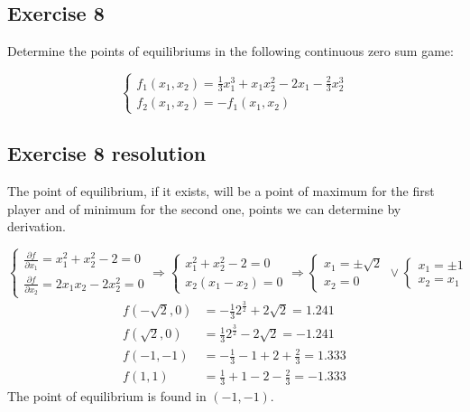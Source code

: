 \documentclass[\main/main.tex]{subfiles}
\begin{document}
\subsection{Exercise 8}
Determine the points of equilibriums in the following continuous zero sum game:

\[
  \begin{cases}
    f_1(x_1,x_2) = \frac{1}{3}x_1^3 + x_1x_2^2 - 2x_1 - \frac{2}{3}x_2^3 \\
    f_2(x_1,x_2) = -f_1(x_1,x_2)
  \end{cases}
\]
\subsection{Exercise 8 resolution}
The point of equilibrium, if it exists, will be a point of maximum for the first player and of minimum for the second one, points we can determine by derivation.

\[
  \begin{cases}
    \frac{\partial f}{\partial x_1}=x_1^2 + x_2^2 -2 = 0 \\
    \frac{\partial f}{\partial x_2}=2x_1x_2 -2x_2^2=0
  \end{cases}
  \Rightarrow
  \begin{cases}
    x_1^2 + x_2^2 -2 = 0 \\
    x_2(x_1 -x_2)=0
  \end{cases}
  \Rightarrow
  \begin{cases}
    x_1 = \pm \sqrt{2} \\
    x_2=0
  \end{cases}
  \lor
  \begin{cases}
    x_1 = \pm 1 \\
    x_2=x_1
  \end{cases}
\]
\begin{align*}
  f(-\sqrt{2},0) & = -\frac{1}{3}2^{\frac{3}{2}} + 2\sqrt{2} = 1.241 \\
  f(\sqrt{2},0)  & = \frac{1}{3}2^{\frac{3}{2}} - 2\sqrt{2} = -1.241 \\
  f(-1,-1)       & = -\frac{1}{3} -1 +2 + \frac{2}{3} = 1.333        \\
  f(1,1)         & = \frac{1}{3} +1 -2 - \frac{2}{3} = -1.333
\end{align*}
The point of equilibrium is found in $(-1,-1)$.
\end{document}

